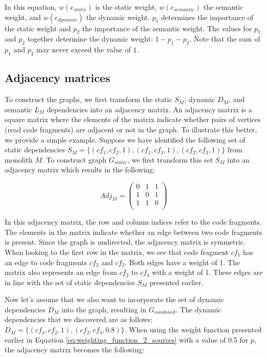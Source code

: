 In this equation, $w(e_{static})$ is the static weight, $w(e_{semantic})$ the semantic weight, and $w(e_{dynamic})$ the dynamic weight. $p_1$ determines the importance of the static weight and $p_2$ the importance of the semantic weight. The values for $p_1$ and $p_2$ together determine the dynamic weight: $1-p_1-p_2$. Note that the sum of $p_1$ and $p_2$ may never exceed the value of $1$.

\subsection{Adjacency matrices}
To construct the graphs, we first transform the static $S_M$, dynamic $D_M$, and semantic $L_M$ dependencies into an adjacency matrix. An adjacency matrix is a square matrix where the elements of the matrix indicate whether pairs of vertices (read code fragments) are adjacent or not in the graph. To illustrate this better, we provide a simple example.
Suppose we have identified the following set of static dependencies $S_M = \{(cf_1, cf_2, 1),(cf_1, cf_3, 1), (cf_2, cf_3, 1)\}$ from monolith $M$. To construct graph $G_{static}$, we first transform this set $S_M$ into an adjacency matrix which results in the following:

\begin{equation*}
    Adj_M = 
    \begin{pmatrix}
    0&1&1\\
    1&0&1\\
    1&1&0\\
    \end{pmatrix}
\end{equation*}

In this adjacency matrix, the row and column indices refer to the code fragments. The elements in the matrix indicate whether an edge between two code fragments is present. Since the graph is undirected, the adjacency matrix is symmetric. When looking to the first row in the matrix, we see that code fragment $cf_1$ has an edge to code fragments $cf_2$ and $cf_3$. Both edges have a weight of 1. The matrix also represents an edge from $cf_2$ to $cf_3$ with a weight of 1. These edges are in line with the set of static dependencies $S_M$ presented earlier. \par
Now let's assume that we also want to incorporate the set of dynamic dependencies $D_M$ into the graph, resulting in $G_{combined}$. The dynamic dependencies that we discovered are as follows: $D_M = \{(cf_1, cf_2, 1), (cf_2, cf_3, 0.8)\}$. When using the weight function presented earlier in Equation \ref{eq:weighting_function_2_sources} with a value of 0.5 for $p$, the adjacency matrix becomes the following:

